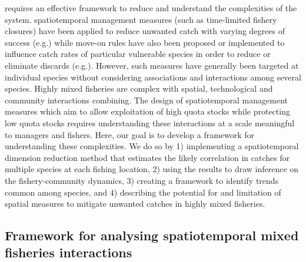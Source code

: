 \documentclass[fleqn,10pt]{wlscirep}
\begin{document}
\begin{linenumbers}
 requires an
effective framework to reduce and understand the complexities of the system.
 spatiotemporal management measures (such as
time-limited fishery closures) have been applied to reduce unwanted catch with
varying degrees of success (e.g.\cite{Needle2011, Holmes2011, Beare2010,
	Dinmore2003}) while move-on rules have also been proposed or
implemented to influence catch rates of particular vulnerable species in order
to reduce or eliminate discards (e.g.\cite{Gardner2008, Dunn2011, Dunn2014a}).
However, such measures have generally been targeted at individual species
without considering associations and interactions among several species. Highly
mixed fisheries are complex with spatial, technological and community
interactions combining. The design of spatiotemporal management measures which
aim to allow exploitation of high quota stocks while protecting low quota
stocks requires understanding these interactions at a scale meaningful to
managers and fishers. Here, our goal is to develop a framework for
understanding these complexities. We do so by 1) implementing a spatiotemporal
dimension reduction method that estimates the likely correlation in catches for
multiple species at each fishing location, 2) using the results to draw
inference on the fishery-community dynamics, 3) creating a framework to
identify trends common among species, and 4) describing the potential for and
limitation of spatial measures to mitigate unwanted catches in highly mixed
fisheries.\\

\subsection*{Framework for analysing spatiotemporal mixed fisheries
	interactions \\}


\end{linenumbers}
\end{document}
